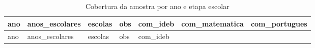 \documentclass[
  brazilian,
  11pt,
]{article}
\begin{document}
\begin{longtable}[]{@{}
  >{\raggedleft\arraybackslash}p{}
  >{\raggedright\arraybackslash}p{}
  >{\raggedleft\arraybackslash}p{}
  >{\raggedleft\arraybackslash}p{}
  >{\raggedleft\arraybackslash}p{}
  >{\raggedleft\arraybackslash}p{}
  >{\raggedleft\arraybackslash}p{}@{}}
\caption{Cobertura da amostra por ano e etapa escolar}\tabularnewline
\toprule\noalign{}
\begin{minipage}[b]{\linewidth}\raggedleft
ano
\end{minipage} & \begin{minipage}[b]{\linewidth}\raggedright
anos\_escolares
\end{minipage} & \begin{minipage}[b]{\linewidth}\raggedleft
escolas
\end{minipage} & \begin{minipage}[b]{\linewidth}\raggedleft
obs
\end{minipage} & \begin{minipage}[b]{\linewidth}\raggedleft
com\_ideb
\end{minipage} & \begin{minipage}[b]{\linewidth}\raggedleft
com\_matematica
\end{minipage} & \begin{minipage}[b]{\linewidth}\raggedleft
com\_portugues
\end{minipage} \\
\midrule\noalign{}
\endfirsthead
\toprule\noalign{}
\begin{minipage}[b]{\linewidth}\raggedleft
ano
\end{minipage} & \begin{minipage}[b]{\linewidth}\raggedright
anos\_escolares
\end{minipage} & \begin{minipage}[b]{\linewidth}\raggedleft
escolas
\end{minipage} & \begin{minipage}[b]{\linewidth}\raggedleft
obs
\end{minipage} & \begin{minipage}[b]{\linewidth}\raggedleft
com\_ideb
\end{minipage} & \begin{minipage}[b]{\linewidth}\raggedleft

\end{minipage}
\end{longtable}
\end{document}
